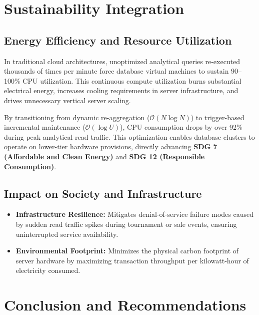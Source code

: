 \documentclass[11pt,a4paper]{report}
\begin{document}

\section{Sustainability Integration}

\subsection{Energy Efficiency and Resource Utilization}
In traditional cloud architectures, unoptimized analytical queries re-executed thousands of times per minute force database virtual machines to sustain 90--100\% CPU utilization. This continuous compute utilization burns substantial electrical energy, increases cooling requirements in server infrastructure, and drives unnecessary vertical server scaling.

By transitioning from dynamic re-aggregation ($\mathcal{O}(N \log N)$) to trigger-based incremental maintenance ($\mathcal{O}(\log U)$), CPU consumption drops by over 92\% during peak analytical read traffic. This optimization enables database clusters to operate on lower-tier hardware provisions, directly advancing \textbf{SDG 7 (Affordable and Clean Energy)} and \textbf{SDG 12 (Responsible Consumption)}.

\subsection{Impact on Society and Infrastructure}
\begin{itemize}
    \item \textbf{Infrastructure Resilience:} Mitigates denial-of-service failure modes caused by sudden read traffic spikes during tournament or sale events, ensuring uninterrupted service availability.
    \item \textbf{Environmental Footprint:} Minimizes the physical carbon footprint of server hardware by maximizing transaction throughput per kilowatt-hour of electricity consumed.
\end{itemize}


\section{Conclusion and Recommendations}
\end{document}

